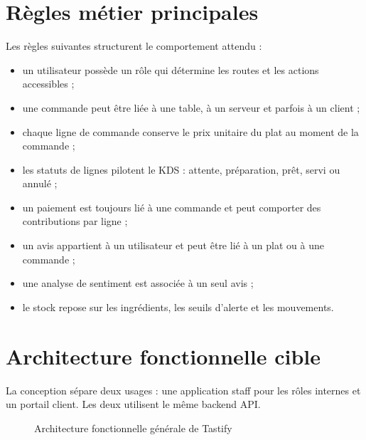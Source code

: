 \section{Règles métier principales}
Les règles suivantes structurent le comportement attendu :

\begin{itemize}
  \item un utilisateur possède un rôle qui détermine les routes et les actions accessibles ;
  \item une commande peut être liée à une table, à un serveur et parfois à un client ;
  \item chaque ligne de commande conserve le prix unitaire du plat au moment de la commande ;
  \item les statuts de lignes pilotent le KDS : attente, préparation, prêt, servi ou annulé ;
  \item un paiement est toujours lié à une commande et peut comporter des contributions par ligne ;
  \item un avis appartient à un utilisateur et peut être lié à un plat ou à une commande ;
  \item une analyse de sentiment est associée à un seul avis ;
  \item le stock repose sur les ingrédients, les seuils d'alerte et les mouvements.
\end{itemize}

\section{Architecture fonctionnelle cible}
La conception sépare deux usages : une application staff pour les rôles internes et un portail client. Les deux utilisent le même backend API.

\begin{figure}[H]
\centering
{}
\caption{Architecture fonctionnelle générale de Tastify}
\label{fig:architecture-fonctionnelle}
\end{figure}

